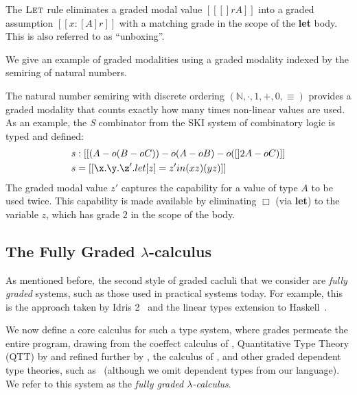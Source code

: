The $\textsc{Let}$ rule eliminates a graded modal value $[[ [] r A ]]$
into a graded assumption $[[ x : [ A ] r ]]$ with a matching
grade in the scope of the \textbf{let} body. This is also referred to as
``unboxing''.

We give an example of graded modalities using a graded modality indexed
by the semiring of natural numbers.

\begin{example}
\label{ex:s-comb}
  The natural number semiring with discrete ordering $(\mathbb{N}, \cdot, 1, +,
  0, \equiv)$ provides a graded modality that counts exactly how many times
  non-linear values are used. As an example, the \emph{S} combinator from
  the SKI system of combinatory logic is typed and defined:
\begin{align*}
s & : [[ (A -o (B -o C)) -o {(A -o B) -o ({[] 2 A} -o C)} ]] \\
s & = [[ \x . {\y . {\z' . {let [ z ] = z' in {(x z) (y z)}}}} ]]
\end{align*}
The graded modal value $z'$ captures the capability for a value
of type $A$ to be used twice. This capability is made available by eliminating
$\Box$ (via \textbf{let}) to the variable $z$, which has
grade $2$ in the scope of the body. 
\end{example}

\subsection{The Fully Graded $\lambda$-calculus}
\label{sec:graded-base}
As mentioned before, the second style of graded cacluli that we consider are
\emph{fully graded} systems, such as those used in practical systems today. For
example, this is the approach taken by Idris
2~\citep{DBLP:journals/corr/abs-2104-00480} and the linear types extension to
Haskell~\citep{DBLP:journals/pacmpl/BernardyBNJS18}.

We now define a core calculus for such a type system, where grades permeate the
entire program, drawing from the coeffect calculus of
\citet{petricek2014coeffects}, Quantitative Type Theory (QTT) by
\citet{McBride2016} and refined further by \citet{quantitative-type-theory}, the calculus of
\citet{DBLP:journals/pacmpl/AbelB20}, and other graded dependent type theories,
such as~\citet{DBLP:conf/esop/MoonEO21} (although we omit dependent types from our language). We refer to this system as the
\textit{fully graded $\lambda$-calculus}.

